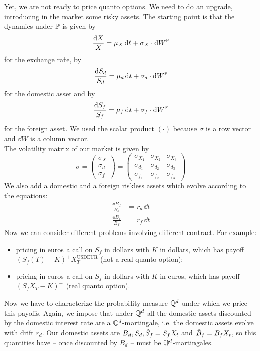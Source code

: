 Yet, we are not ready to price quanto options. We need to do an upgrade, introducing in the market some risky assets. The starting point is that the dynamics under $\mathbb{P}$ is given by
\begin{equation}
    \frac{\dd X}{X} = \mu_X\,\dd t + \sigma_X\cdot\dd W^{\mathbb{P}}
\end{equation}
for the exchange rate, by
\begin{equation}\label{Sd}
    \frac{\dd S_d}{S_d} = \mu_d\,\dd t + \sigma_d\cdot\dd W^{\mathbb{P}}
\end{equation}\label{Sf}
for the domestic asset and by
\begin{equation}
    \frac{\dd S_f}{S_f} = \mu_f\,\dd t + \sigma_f\cdot\dd W^{\mathbb{P}}
\end{equation}
for the foreign asset. We used the scalar product $(\cdot)$ because $\sigma$ is a row vector and $\dd W$ is a column vector.\\
The volatility matrix of our market is given by
\begin{equation}
    \sigma =
    \begin{pmatrix}
    \sigma_X \\ \sigma_d \\ \sigma_f
    \end{pmatrix} =
    \begin{pmatrix}
    \sigma_{X_1} & \sigma_{X_2} & \sigma_{X_3} \\
    \sigma_{d_1} & \sigma_{d_2} & \sigma_{d_3} \\
    \sigma_{f_1} & \sigma_{f_2} & \sigma_{f_3}
    \end{pmatrix}
\end{equation}
We also add a domestic and a foreign riskless assets which evolve according to the equations:
\begin{align}
    \frac{\dd B_d}{B_d} &= r_d\,\dd t \\
    \frac{\dd B_f}{B_f} &= r_f\,\dd t
\end{align}
Now we can consider different problems involving different contract. For example:
\begin{itemize}
    \item pricing in euros a call on $S_f$ in dollars with $K$ in dollars, which has payoff $(S_f(T)-K)^+X_T^{\text{USDEUR}}$ (not a real quanto option);
    \item pricing in euros a call on $S_f$ in dollars with $K$ in euros, which has payoff $(S_fX_T-K)^+$ (real quanto option).
\end{itemize}
Now we have to characterize the probability measure $\mathbb{Q}^d$ under which we price this payoffs. Again, we impose that under $\mathbb{Q}^d$ all the domestic assets discounted by the domestic interest rate are a $\mathbb{Q}^d$-martingale, i.e. the domestic assets evolve with drift $r_d$. Our domestic assets are $B_d, S_d, \Tilde{S}_f = S_fX_t$ and $\Tilde{B}_f = B_fX_t$, so this quantities have -- once discounted by $B_d$ -- must be $\mathbb{Q}^d$-martingales.\\
